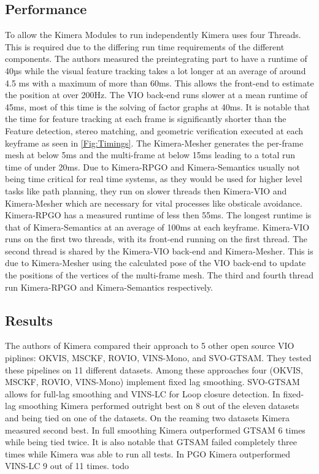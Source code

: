 \documentclass[11pt,a4paper]{article}
\begin{document}
\subsection{Performance}
To allow the Kimera Modules to run independently Kimera uses four Threads. This is required due to the differing run time requirements of the different components.
The authors measured the preintegrating part to have a runtime of 40µs while the visual feature tracking takes a lot longer at an average of around 4.5 ms with a maximum of more than 60ms.
This allows the front-end to estimate the position at over 200Hz.
The VIO back-end runs slower at a mean runtime of 45ms, most of this time is the solving of factor graphs at 40ms. 
It is notable that the time for feature tracking at each frame is significantly shorter than the Feature detection, stereo matching,
and geometric verification executed at each keyframe as seen in \ref{Fig:Timings}.
The Kimera-Mesher generates the per-frame mesh at below 5ms and the multi-frame at below 15ms leading to a total run time of under 20ms.
Due to Kimera-RPGO and Kimera-Semantics usually not being time critical for real time systems, as they would be used for higher level tasks like path planning, they run on slower threads then Kimera-VIO and Kimera-Mesher which are necessary for vital processes like obsticale avoidance.
Kimera-RPGO has a measured runtime of less then 55ms.
The longest runtime is that of Kimera-Semantics at an average of 100ms at each keyframe. 
Kimera-VIO runs on the first two threads, with its front-end running on the first thread.
The second thread is shared by the Kimera-VIO back-end and Kimera-Mesher.
This is due to Kimera-Mesher using the calculated pose of the VIO back-end to update the positions of the vertices of the multi-frame mesh.
The third and fourth thread run Kimera-RPGO and Kimera-Semantics respectively. 

\subsection{Results}
The authors of Kimera compared their approach to 5 other open source VIO piplines: OKVIS, MSCKF, ROVIO, VINS-Mono, and SVO-GTSAM.
They tested these pipelines on 11 different datasets.
Among these approaches four (OKVIS, MSCKF, ROVIO, VINS-Mono) implement fixed lag smoothing. 
SVO-GTSAM allows for full-lag smoothing and VINS-LC for Loop closure detection. 
In fixed-lag smoothing Kimera performed outright best on 8 out of the eleven datasets and being tied on one of the datasets. 
On the reaming two datasets Kimera measured second best.
In full smoothing Kimera outperformed GTSAM 6 times while being tied twice. 
It is also notable that GTSAM failed completely three times while Kimera was able to run all tests.
In PGO Kimera outperformed VINS-LC 9 out of 11 times. 
todo
\end{document}
